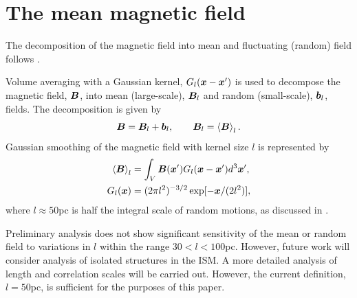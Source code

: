 \documentclass[useAMS,usenatbib]{mn2e}
\begin{document}
\section{The mean magnetic field}
The decomposition of the magnetic field into mean and fluctuating (random) field follows \MHD.

Volume averaging with a Gaussian kernel, $G_{l}(\boldsymbol{x}-\boldsymbol{x}')$ is used to decompose the magnetic field, $\boldsymbol{B}$, into mean (large-scale), $\boldsymbol{B}_{l}$ and random (small-scale), $\boldsymbol{b}_{l}$, fields. The decomposition is given by 
\begin{equation}
\boldsymbol{B} = \boldsymbol{B}_{l}+\boldsymbol{b}_{l},\qquad \boldsymbol{B}_{l} = \left<\boldsymbol{B}\right>_{l}. \label{decomp} 
\end{equation}
Gaussian smoothing of the magnetic field with kernel size $l$ is represented by
\begin{align}
\left<\boldsymbol{B}\right>_{l}&=\int_{V}\boldsymbol{B}(\boldsymbol{x}')G_{l}(\boldsymbol{x}-\boldsymbol{x}')d^{3}\boldsymbol{x}',\\
G_{l}(\boldsymbol{x})&=(2\pi l^2)^{-3/2}\exp[-\boldsymbol{x}/(2l^2)],\nonumber
\label{gauss}
\end{align} 
where $l\approx50$pc is half the integral scale of random motions, as discussed
in \HD.  

Preliminary analysis does not show significant sensitivity of the mean or random field to variations in $l$ within the range $30<l<100$pc. However, future work will consider analysis of isolated structures in the ISM. A more detailed analysis of length and correlation scales will be carried out. However, the current definition, $l=50$pc, is sufficient for the purposes of this paper. 
\end{document}
